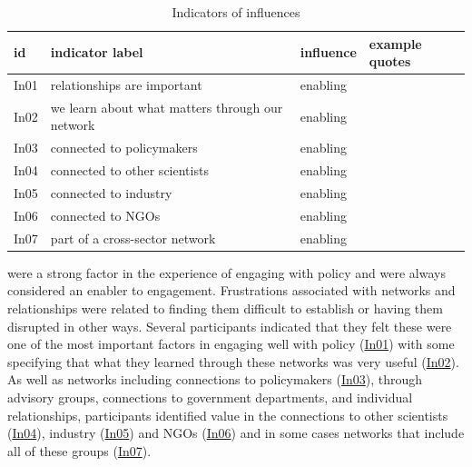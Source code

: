 \begin{table}[!ht]
\footnotesize
\caption{Indicators of \skinetw{} influences}\label{tab:resskinetw}
\begin{tabular}{L{.07\linewidth}L{.3\linewidth}L{.11\linewidth}L{.52\linewidth}} \hline
\textbf{id} & \textbf{indicator label} & \textbf{influence} & \textbf{example quotes} \\ \hline \hline 
In01 & relationships are important & enabling &  \\
In02 & we learn about what matters through our network & enabling &  \\
In03 & connected to policymakers & enabling &  \\
In04 & connected to other scientists & enabling &  \\
In05 & connected to industry & enabling &  \\
In06 & connected to NGOs & enabling &  \\
In07 & part of a cross-sector network & enabling &  \\
\hline
\end{tabular}
\end{table}

\skinetw{} were a strong factor in the experience of engaging with policy and were always considered an enabler to engagement. Frustrations associated with networks and relationships were related to finding them difficult to establish or having them disrupted in other ways. Several participants indicated that they felt these were one of the most important factors in engaging well with policy (\hyperref[tab:resskinetw]{In01}) with some specifying that what they learned through these networks was very useful (\hyperref[tab:resskinetw]{In02}). As well as networks including connections to policymakers (\hyperref[tab:resskinetw]{In03}), through advisory groups, connections to government departments, and individual relationships, participants identified value in the connections to other scientists (\hyperref[tab:resskinetw]{In04}), industry (\hyperref[tab:resskinetw]{In05}) and NGOs (\hyperref[tab:resskinetw]{In06}) and in some cases networks that include all of these groups (\hyperref[tab:resskinetw]{In07}).


